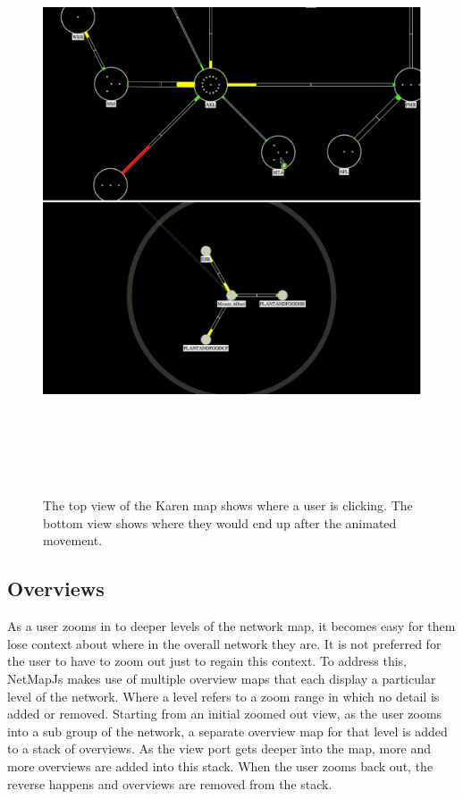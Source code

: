 \documentclass[11pt, a4paper]{article}
\begin{document}
\begin{figure}
\centering
\includegraphics[width=170mm,height=173.22mm]{assets/nav1-2.eps}
\caption{The top view of the Karen map shows where a user is clicking. The bottom
view shows where they would end up after the animated movement.}
\label{fig:nav1.2}
\end{figure}

\subsection{Overviews}
\label{sec:overviews.vis}

As a user zooms in to deeper levels of the network map, it becomes easy for them
lose context about where in the overall network they are. It is not preferred
for the user to have to zoom out just to regain this context. To address this,
NetMapJs makes use of multiple overview maps that each display a particular
level of the network. Where a level refers to a zoom range in which no detail is
added or removed. Starting from an initial zoomed out view, as the user zooms
into a sub group of the network, a separate overview map for that level is added
to a stack of overviews. As the view port gets deeper into the map, more and
more overviews are added into this stack. When the user zooms back out, the
reverse happens and overviews are removed from the stack.
\end{document}
